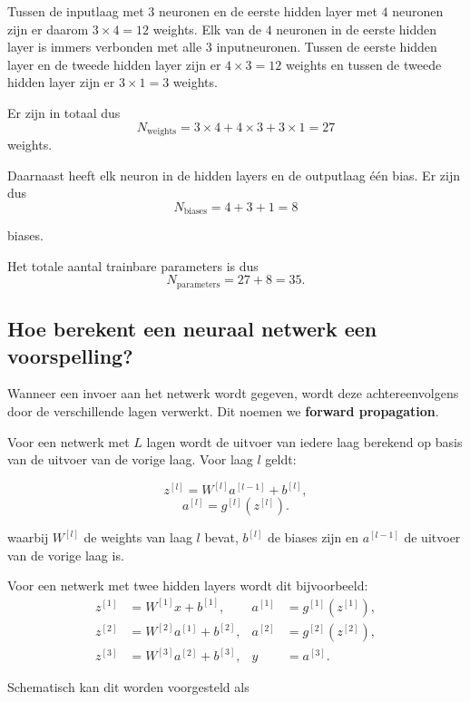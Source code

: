 \documentclass{ximera}
\begin{document}
\begin{question}
\begin{feedback}
Tussen de inputlaag met $3$ neuronen en de eerste hidden layer met $4$ neuronen zijn er daarom $3\times4=12$ weights. Elk van de $4$ neuronen in de eerste hidden layer is immers verbonden met alle $3$ inputneuronen.
Tussen de eerste hidden layer en de tweede hidden layer zijn er $4\times3=12$ weights en tussen de tweede hidden layer zijn er $3\times1=3$ weights.

Er zijn in totaal dus \[N_{\mathrm{weights}} = 3\times4+4\times3+3\times1=27\]
weights. 

Daarnaast heeft elk neuron in de hidden layers en de outputlaag één bias. Er zijn dus
\[
N_{\mathrm{biases}}
=
4+3+1
=
8
\]

biases.

Het totale aantal trainbare parameters is dus
\[
N_{\mathrm{parameters}}
=
27+8
=
\boxed{35}.
\]
    
\end{feedback}
\end{question}

\subsection*{Hoe berekent een neuraal netwerk een voorspelling?}

Wanneer een invoer aan het netwerk wordt gegeven, wordt deze achtereenvolgens door de verschillende lagen verwerkt. Dit noemen we
\textbf{forward propagation}.

Voor een netwerk met $L$ lagen wordt de uitvoer van iedere laag berekend op basis van de uitvoer van de vorige laag. Voor laag $l$ geldt:

\[
z^{[l]}
=
W^{[l]}a^{[l-1]}+b^{[l]},
\]
\[
a^{[l]}
=
g^{[l]}\left(z^{[l]}\right).
\]

waarbij $W^{[l]}$ de weights van laag $l$ bevat, $b^{[l]}$ de biases zijn en $a^{[l-1]}$ de uitvoer van de vorige laag is.

Voor een netwerk met twee hidden layers wordt dit bijvoorbeeld:
\[
\boxed{
\begin{aligned}
z^{[1]} &= W^{[1]}x+b^{[1]}, &
a^{[1]} &= g^{[1]}(z^{[1]}),\\[2mm]
z^{[2]} &= W^{[2]}a^{[1]}+b^{[2]}, &
a^{[2]} &= g^{[2]}(z^{[2]}),\\[2mm]
z^{[3]} &= W^{[3]}a^{[2]}+b^{[3]}, &
\hat{y} &= a^{[3]}.
\end{aligned}
}
\]

Schematisch kan dit worden voorgesteld als
\end{document}
